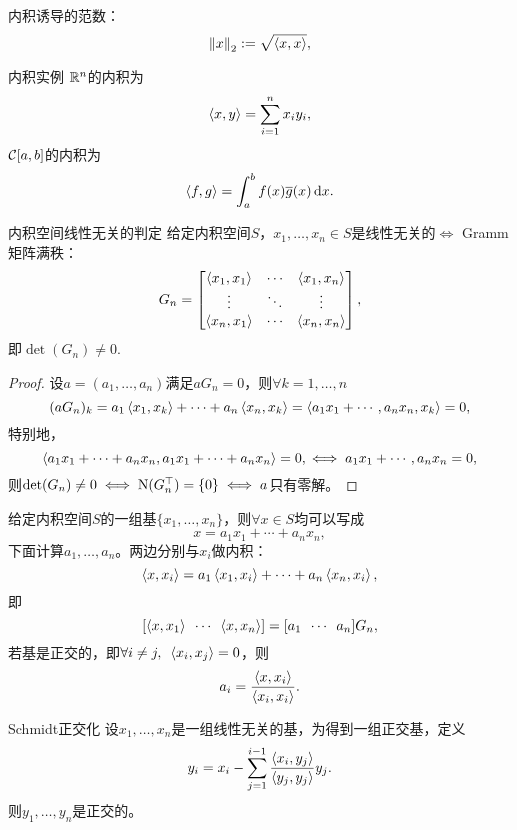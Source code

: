 内积诱导的范数：
\begin{equation}
    \left\lVert x\right\rVert_2:=\sqrt{\left\langle x,x\right\rangle},
\end{equation}

\begin{example}
    {内积实例}{}
    $\mathbb R^n$的内积为
    \[
        \left\langle x,y\right\rangle=\sum_{i=1}^nx_iy_i,
    \]
    $\mathcal C[a,b]$的内积为 
    \[
        \left\langle f,g\right\rangle=\int_a^bf(x)\overline g(x)\mathop{}\!\mathrm{d} x.
    \]
\end{example}

\begin{theorem}
    {内积空间线性无关的判定}{}
    给定内积空间$S$，$x_1,\ldots,x_n\in S$是线性无关的$\iff$ Gramm矩阵满秩：
    \begin{equation}
        G_n=\begin{bmatrix}
            \left\langle x_1,x_1\right\rangle&\cdots&\left\langle x_1,x_n\right\rangle\\
            \vdots&\ddots&\vdots\\
            \left\langle x_n,x_1\right\rangle&\cdots&\left\langle x_n,x_n\right\rangle
        \end{bmatrix},
    \end{equation}
    即$\det(G_n)\neq 0.$
\end{theorem}

\begin{proof}
    设$a=(a_1,\ldots,a_n)$满足$aG_n=0$，则$\forall k=1,\ldots,n$
    \[
        (aG_n)_k=a_1\left\langle x_1,x_k\right\rangle+\cdots+a_n\left\langle x_n,x_k\right\rangle=\left\langle a_1x_1+\cdots,a_nx_n,x_k\right\rangle=0,
    \]
    特别地，
    \[
        \left\langle a_1x_1+\cdots+a_nx_n,a_1x_1+\cdots+a_nx_n\right\rangle=0,\iff a_1x_1+\cdots,a_nx_n=0,
    \]
    则$\det(G_n)\neq 0\iff \mathrm N(G_n^\top)=\{0\}\iff a$只有零解。
\end{proof}

\begin{example}
    {}{}
    给定内积空间$S$的一组基$\{x_1,\ldots,x_n\}$，则$\forall x\in S$均可以写成
    \[
        x=a_1x_1+\cdots+a_nx_n,
    \]
    下面计算$a_1,\ldots,a_n$。两边分别与$x_i$做内积：
    \[
        \left\langle x,x_i\right\rangle=a_1\left\langle x_1,x_i\right\rangle+\cdots+a_n\left\langle x_n,x_i\right\rangle,
    \]
    即
    \[
        [\left\langle x,x_1\right\rangle\enspace\cdots\enspace\left\langle x,x_n\right\rangle]=[a_1\enspace\cdots\enspace a_n]G_n,
    \]
    若基是正交的，即$\forall i\neq j,\enspace\left\langle x_i,x_j\right\rangle=0$，则 
    \[
        a_i=\frac{\left\langle x,x_i\right\rangle}{\left\langle x_i,x_i\right\rangle}.
    \]
\end{example}

\begin{theorem}
    {Schmidt正交化}{}
    设$x_1,\ldots,x_n$是一组线性无关的基，为得到一组正交基，定义
    \begin{equation}
        y_i=x_i-\sum_{j=1}^{i-1}\frac{\left\langle x_i,y_j\right\rangle}{\left\langle y_j,y_j\right\rangle}y_j.
    \end{equation}
    则$y_1,\ldots,y_n$是正交的。
\end{theorem}

